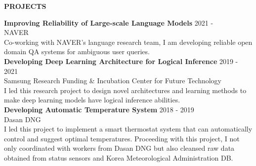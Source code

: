\documentclass[12pt]{article}
\begin{document}







\begin{center}
	{\noindent \bfseries PROJECTS}
    \noindent\makebox[\linewidth]{\rule{0.75\paperwidth}{0.4pt}}
\end{center}

\noindent
{\bfseries Improving Reliability of Large-scale Language Models} \hfill 2021 - \\ 
\noindent 
NAVER \\
Co-working with NAVER's language research team, I am developing reliable open domain QA systems for ambiguous user queries.
\\ 

\noindent
{\bfseries Developing Deep Learning Architecture for Logical Inference} \hfill 2019 - 2021\\ 
\noindent 
Samsung Research Funding \& Incubation Center for Future Technology \\
I led this research project to design novel architectures and learning methods to make deep learning models have logical inference abilities.
\\ 

\noindent
{\bfseries Developing Automatic Temperature System} \hfill 2018 - 2019 \\ 
\noindent 
Dasan DNG\\
I led this project to implement a smart thermostat system that can automatically control and suggest optimal temperatures.
Proceeding with this project, I not only coordinated with workers from Dasan DNG but also cleansed raw data obtained from status sensors and Korea Meteorological Administration DB.\\
\end{document}
